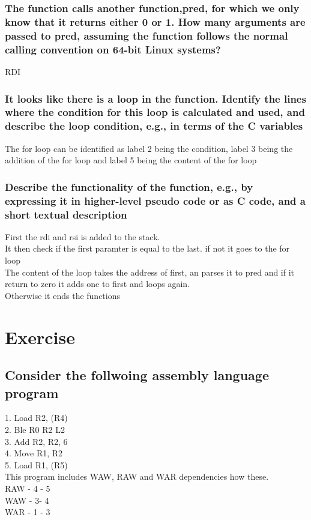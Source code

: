 \documentclass[12pt, a4paper]{article}
\begin{document}
			\subsubsection{The function calls another function,pred, for which we only know that it returns either 0 or 1. How many arguments are passed to pred, assuming the function follows the normal calling convention on 64-bit Linux systems?}
				RDI
			\subsubsection{It looks like there is a loop in the function. Identify the lines where the condition for this loop is calculated and used, and describe the loop condition, e.g., in terms of the C variables}
				The for loop can be identified as label 2 being the condition, label 3 being the addition of the for loop and label 5 being the content of the for loop
			\subsubsection{Describe the functionality of the function, e.g., by expressing it in higher-level pseudo code or as C code, and a short textual description}
				First the rdi and rsi is added to the stack.\\
				It then check if the first paramter is equal to the last. if not it goes to the for loop\\
				The content of the loop takes the address of first, an parses it to pred and if it return to zero it adds one to first and loops again.\\
				Otherwise it ends the functions
	\section{Exercise}
		\subsection{Consider the follwoing assembly language program}
			1. Load R2, (R4)\\
			2. Ble R0 R2 L2\\
			3. Add R2, R2, 6\\
			4. Move R1, R2\\
			5. Load R1, (R5)\\
			This program includes WAW, RAW and WAR dependencies how these.\\
			RAW - 4 - 5\\
			WAW - 3- 4\\
			WAR - 1 - 3
\end{document}
